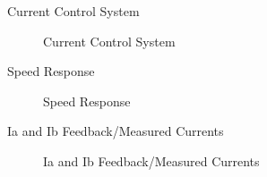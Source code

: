 \begin{frame}{Current Control System}
	\begin{figure}
		\centering

		\caption{Current Control System}
	\end{figure}
\end{frame}



\begin{frame}{Speed Response}
	\begin{figure}
		\centering

		\caption{Speed Response}
	\end{figure}
\end{frame}


\begin{frame}{Ia and Ib Feedback/Measured Currents}
	\begin{figure}
		\centering

		\caption{Ia and Ib Feedback/Measured Currents}
	\end{figure}
\end{frame}


